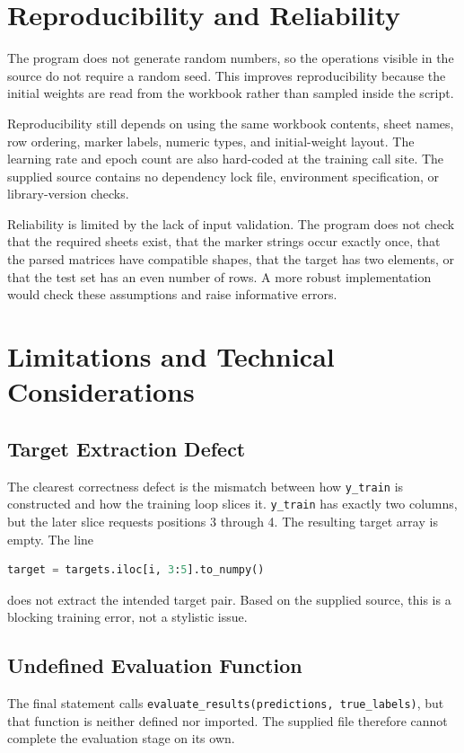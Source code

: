 \documentclass[11pt,a4paper]{article}
\newcommand{\code}[1]{\texttt{\small #1}}
\begin{document}
\section{Reproducibility and Reliability}
The program does not generate random numbers, so the operations visible in the source do not require a random seed. This improves reproducibility because the initial weights are read from the workbook rather than sampled inside the script.

Reproducibility still depends on using the same workbook contents, sheet names, row ordering, marker labels, numeric types, and initial-weight layout. The learning rate and epoch count are also hard-coded at the training call site. The supplied source contains no dependency lock file, environment specification, or library-version checks.

Reliability is limited by the lack of input validation. The program does not check that the required sheets exist, that the marker strings occur exactly once, that the parsed matrices have compatible shapes, that the target has two elements, or that the test set has an even number of rows. A more robust implementation would check these assumptions and raise informative errors.

\section{Limitations and Technical Considerations}
\subsection{Target Extraction Defect}
The clearest correctness defect is the mismatch between how \code{y\_train} is constructed and how the training loop slices it. \code{y\_train} has exactly two columns, but the later slice requests positions 3 through 4. The resulting target array is empty. The line
\begin{lstlisting}[language=Python]
target = targets.iloc[i, 3:5].to_numpy()
\end{lstlisting}
does not extract the intended target pair. Based on the supplied source, this is a blocking training error, not a stylistic issue.

\subsection{Undefined Evaluation Function}
The final statement calls \code{evaluate\_results(predictions, true\_labels)}, but that function is neither defined nor imported. The supplied file therefore cannot complete the evaluation stage on its own.
\end{document}
